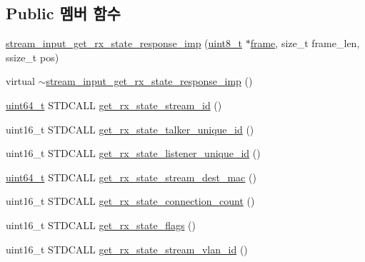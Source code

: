 \subsection*{Public 멤버 함수}
\begin{DoxyCompactItemize}
\item 
\hyperlink{classavdecc__lib_1_1stream__input__get__rx__state__response__imp_ab2239e971886d9f432edd151af9d7484}{stream\+\_\+input\+\_\+get\+\_\+rx\+\_\+state\+\_\+response\+\_\+imp} (\hyperlink{stdint_8h_aba7bc1797add20fe3efdf37ced1182c5}{uint8\+\_\+t} $\ast$\hyperlink{gst__avb__playbin_8c_ac8e710e0b5e994c0545d75d69868c6f0}{frame}, size\+\_\+t frame\+\_\+len, ssize\+\_\+t pos)
\item 
virtual \hyperlink{classavdecc__lib_1_1stream__input__get__rx__state__response__imp_af41942c67f62c966e9270cfa779c3293}{$\sim$stream\+\_\+input\+\_\+get\+\_\+rx\+\_\+state\+\_\+response\+\_\+imp} ()
\item 
\hyperlink{parse_8c_aec6fcb673ff035718c238c8c9d544c47}{uint64\+\_\+t} S\+T\+D\+C\+A\+LL \hyperlink{classavdecc__lib_1_1stream__input__get__rx__state__response__imp_a69d029e252d76bb91c96e8f972f3c2d3}{get\+\_\+rx\+\_\+state\+\_\+stream\+\_\+id} ()
\item 
uint16\+\_\+t S\+T\+D\+C\+A\+LL \hyperlink{classavdecc__lib_1_1stream__input__get__rx__state__response__imp_a9d115a6048fb121307e0af78dbf8cf32}{get\+\_\+rx\+\_\+state\+\_\+talker\+\_\+unique\+\_\+id} ()
\item 
uint16\+\_\+t S\+T\+D\+C\+A\+LL \hyperlink{classavdecc__lib_1_1stream__input__get__rx__state__response__imp_a0485733f2f7e1f7644d56e7f47f23fb1}{get\+\_\+rx\+\_\+state\+\_\+listener\+\_\+unique\+\_\+id} ()
\item 
\hyperlink{parse_8c_aec6fcb673ff035718c238c8c9d544c47}{uint64\+\_\+t} S\+T\+D\+C\+A\+LL \hyperlink{classavdecc__lib_1_1stream__input__get__rx__state__response__imp_a11a76591a4d76daa5ba912d8085f1cbe}{get\+\_\+rx\+\_\+state\+\_\+stream\+\_\+dest\+\_\+mac} ()
\item 
uint16\+\_\+t S\+T\+D\+C\+A\+LL \hyperlink{classavdecc__lib_1_1stream__input__get__rx__state__response__imp_a325706c224cfb8e1807ba3d141d5b5b4}{get\+\_\+rx\+\_\+state\+\_\+connection\+\_\+count} ()
\item 
uint16\+\_\+t S\+T\+D\+C\+A\+LL \hyperlink{classavdecc__lib_1_1stream__input__get__rx__state__response__imp_ac60fc558e0e2bbefec482ba198f4fd53}{get\+\_\+rx\+\_\+state\+\_\+flags} ()
\item 
uint16\+\_\+t S\+T\+D\+C\+A\+LL \hyperlink{classavdecc__lib_1_1stream__input__get__rx__state__response__imp_a8f5ca0cb7c9d9ecbcbea4e901f0c9def}{get\+\_\+rx\+\_\+state\+\_\+stream\+\_\+vlan\+\_\+id} ()
\end{DoxyCompactItemize}
